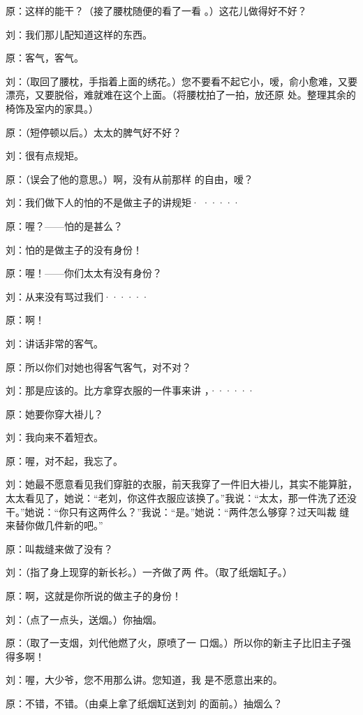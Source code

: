 \documentclass{article}
\begin{document}
原：这样的能干？（接了腰枕随便的看了一看
。）这花儿做得好不好？ 


刘：我们那儿配知道这样的东西。 


原：客气，客气。 

刘：（取回了腰枕，手指着上面的绣花。）您不要看不起它小，嗳，俞小愈难，又要漂亮，又要脱俗，难就难在这个上面。（将腰枕拍了一拍，放还原
处。整理其余的椅饰及室内的家具。） 


原：（短停顿以后。）太太的脾气好不好？ 


刘：很有点规矩。 

原：（误会了他的意思。）啊，没有从前那样
的自由，嗳？ 

\newpage

刘：我们做下人的怕的不是做主子的讲规矩·
····· 


原：喔？——怕的是甚么？ 


刘：怕的是做主子的没有身份！ 


原：喔！——你们太太有没有身份？ 


刘：从来没有骂过我们······ 


原：啊！ 


刘：讲话非常的客气。 


原：所以你们对她也得客气客气，对不对？ 

刘：那是应该的。比方拿穿衣服的一件事来讲
，······ 


\newpage

原：她要你穿大褂儿？ 


刘：我向来不着短衣。 


原：喔，对不起，我忘了。 

刘：她最不愿意看见我们穿脏的衣服，前天我穿了一件旧大褂儿，其实不能算脏，太太看见了，她说：“老刘，你这件衣服应该换了。”我说：“太太，那一件洗了还没干。”她说：“你只有这两件么？”我说：“是。”她说：“两件怎么够穿？过天叫裁
缝来替你做几件新的吧。” 


原：叫裁缝来做了没有？ 

刘：（指了身上现穿的新长衫。）一齐做了两
件。（取了纸烟缸子。） 


原：啊，这就是你所说的做主子的身份！ 


刘：（点了一点头，送烟。）你抽烟。 

\newpage

原：（取了一支烟，刘代他燃了火，原喷了一
口烟。）所以你的新主子比旧主子强得多啊！ 

刘：喔，大少爷，您不用那么讲。您知道，我
是不愿意出来的。 

原：不错，不错。（由桌上拿了纸烟缸送到刘
的面前。）抽烟么？ 
\end{document}
